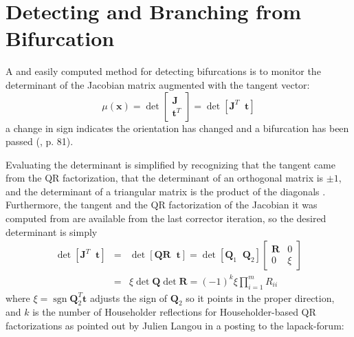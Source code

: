\documentclass[11pt,openany,twoside]{book}
\numberwithin{equation}{section}		%
\newcommand{\Matrix}[1]{\boldsymbol{#1}}
\newcommand{\Vector}[1]{\boldsymbol{#1}}
\newcommand{\Sgn}{\operatorname{sgn}}
\newcommand{\Det}{\operatorname{\det}}
\begin{document}
\section{Detecting and Branching from Bifurcation}\label{sect:detect-bifurcation}
A and easily computed method for detecting bifurcations
is to monitor the determinant of the Jacobian matrix augmented with
the tangent vector:
\begin{equation}
	\label{eqn:determinant}
	\mu(\Vector{x}) = \Det \left[ \begin{array}{c}
		\Matrix{J} \\
		\Vector{t}^T
	\end{array} \right] =
	\Det \left[
		\Matrix{J}^T \;\; \Vector{t}
	\right]
\end{equation}
a change in sign indicates the orientation has changed and a
bifurcation has been passed (\cite{allgower1990numerical}, p. 81).
\par
Evaluating the determinant is simplified by recognizing that the
tangent came from the QR factorization, that the determinant of an
orthogonal matrix is $\pm 1$, and the determinant of a triangular matrix
is the product of the diagonals \cite{meyer2015continuation}.
Furthermore, the tangent and the QR factorization of the Jacobian
it was computed from are available from the last corrector iteration,
so the desired determinant is simply
\begin{eqnarray}
	\label{eqn:deteval}
	\Det \left[
		\Matrix{J}^T \;\; \Vector{t}
	\right] &=&
	\Det \left[
		\Matrix{QR} \;\; \Vector{t}
		\right] =
	\Det \left[ \Matrix{Q}_1 \;\; \Matrix{Q}_2 \right]
		\left[ \begin{array}{cc}
			\Matrix{R} & 0 \\
			         0   & \xi
		\end{array} \right]  \nonumber \\
	&=& \xi \Det \Matrix{Q} \Det \Matrix{R} =
		(-1)^k \xi \prod_{i=1}^m R_{ii}
\end{eqnarray}
where $\xi = \Sgn{\Matrix{Q}_2^T\Vector{t}}$ adjusts the sign of $\Matrix{Q}_2$
so it points in the proper direction,
and $k$ is the number of Householder reflections for Householder-based
QR factorizations as pointed out by Julien Langou in a posting to
the lapack-forum:
\end{document}
